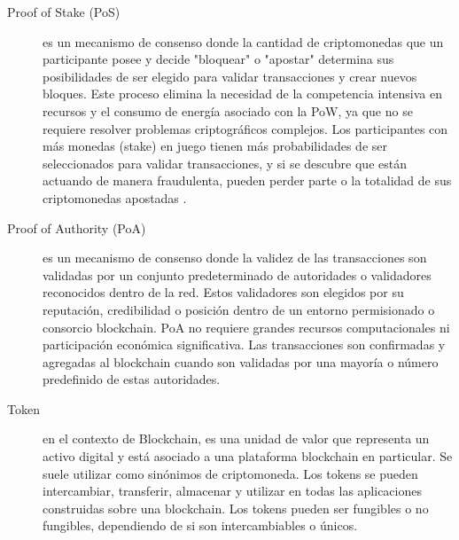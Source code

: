 \documentclass{article}
\begin{document}
\begin{description}
	\item[Proof of Stake (PoS)] es un mecanismo de consenso donde la cantidad de criptomonedas que un participante posee y decide "bloquear" o "apostar" determina sus posibilidades de ser elegido para validar transacciones y crear nuevos bloques. Este proceso elimina la necesidad de la competencia intensiva en recursos y el consumo de energía asociado con la PoW, ya que no se requiere resolver problemas criptográficos complejos. Los participantes con más monedas (stake) en juego tienen más probabilidades de ser seleccionados para validar transacciones, y si se descubre que están actuando de manera fraudulenta, pueden perder parte o la totalidad de sus criptomonedas apostadas \cite{rennock2018blockchain}.

	\item[Proof of Authority (PoA)] es un mecanismo de consenso donde la validez de las transacciones son validadas por un conjunto predeterminado de autoridades o validadores reconocidos dentro de la red. Estos validadores son elegidos por su reputación, credibilidad o posición dentro de un entorno permisionado o consorcio blockchain. PoA no requiere grandes recursos computacionales ni participación económica significativa. Las transacciones son confirmadas y agregadas al blockchain cuando son validadas por una mayoría o número predefinido de estas autoridades.
	
	\item[Token] en el contexto de Blockchain, es una unidad de valor que representa un activo digital y está asociado a una plataforma blockchain en particular. Se suele utilizar como sinónimos de criptomoneda. Los tokens se pueden intercambiar, transferir, almacenar y utilizar en todas las aplicaciones construidas sobre una blockchain. Los tokens pueden ser fungibles o no fungibles, dependiendo de si son intercambiables o únicos.

\end{description}
\end{document}
